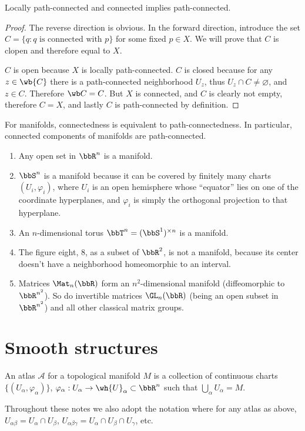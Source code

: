 \begin{lem}
    Locally path-connected and connected implies path-connected.
\end{lem}
\begin{proof}
    The reverse direction is obvious. In the forward direction, introduce the set $C=\{q:q\text{ is connected with }p\}$  for some fixed $p\in X$. We will prove that $C$ is clopen and therefore equal to $X$.

    $C$ is open because $X$ is locally path-connected.
    $C$ is closed because for any $z\in\wb{C}$ there is a path-connected neighborhood $U_z$, thus $U_z\cap C\neq \varnothing$, and $z\in C$. Therefore $\wb C=C$. 
    But $X$ is connected, and $C$ is clearly not empty, therefore $C=X$, and lastly $C$ is path-connected by definition.
\end{proof}
\begin{cor}
    For manifolds, connectedness is equivalent to path-connectedness. In particular, connected components of manifolds are path-connected.
\end{cor}

\begin{example}
\begin{enumerate}
    \item Any open set in $\bbR^n$ is a manifold.
    \item $\bbS^n$ is a manifold because it can be covered by finitely many charts $(U_i,\varphi_i)$, where $U_i$ is an open hemisphere whose ``equator'' lies on one of the coordinate hyperplanes, and $\varphi_i$ is simply the orthogonal projection to that hyperplane.
    \item An $n$-dimensional torus $\bbT^n=(\bbS^1)^{\times n}$ is a manifold.
    \item The figure eight, 8, as a subset of $\bbR^2$, is not a manifold, because its center doesn't have a neighborhood homeomorphic to an interval.
    \item Matrices $\Mat_n(\bbR)$ form an $n^2$-dimensional manifold (diffeomorphic to $\bbR^{n^2}$). So do invertible matrices $\GL_n(\bbR)$ (being an open subset in $\bbR^{n^2}$) and all other classical matrix groups.
\end{enumerate}
\end{example}

\section{Smooth structures}
\begin{defn}[Atlas]
    An atlas $\mathcal{A}$ for a topological manifold $M$ is a collection of continuous charts $\{(U_\alpha,\varphi_\alpha)\}$, $\varphi_\alpha:U_\alpha\to \wh{U}_\alpha \subset \bbR^n$ such that $\bigcup_\alpha U_\alpha =M$.
\end{defn}
Throughout these notes we also adopt the notation where for any atlas as above, $U_{\alpha\beta}=U_\alpha \cap U_\beta$, $U_{\alpha\beta\gamma}=U_\alpha \cap U_\beta \cap U_\gamma$, etc.

